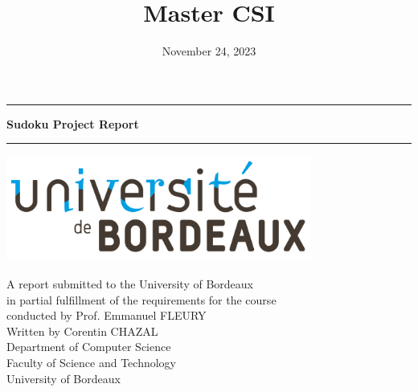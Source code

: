 \documentclass[a4paper, 11pt]{article}
\title{Master CSI}
\date{}  %
\begin{document}
\maketitle
\thispagestyle{empty}  %

\begin{center}
    \hrule %
    \vspace{1\baselineskip}
    {\Huge\bfseries Sudoku Project Report}  %
    
    \vspace{1\baselineskip}  %
    \hrule  %
    \vspace{1\baselineskip}  %
    
    \vspace{2\baselineskip} 
    \includegraphics[width=10cm]{university_logo.png}  %
 
    \vspace{6\baselineskip}  %
    
    \large
    A report submitted to the University of Bordeaux \\
    in partial fulfillment of the requirements for the course \\
    conducted by Prof. Emmanuel FLEURY \\
    
    \vspace{5\baselineskip}  %
    Written by Corentin CHAZAL \\
    
    \vspace{5\baselineskip}  %
    Department of Computer Science \\
    Faculty of Science and Technology \\
    University of Bordeaux \\
    
    \vspace{4\baselineskip}  %
    \date{November 24, 2023}
\end{center}
\end{document}
